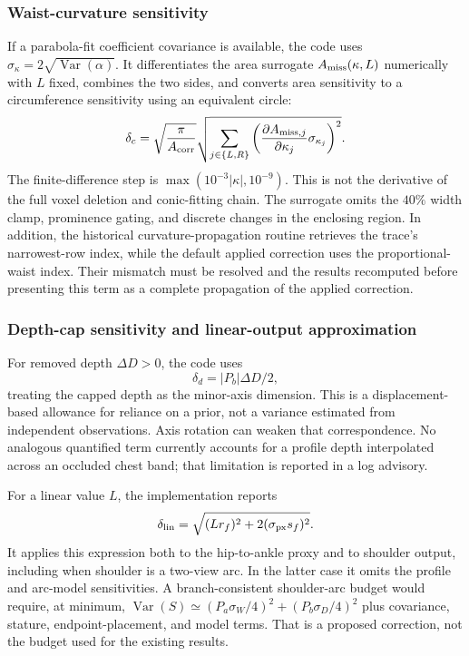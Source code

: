 \subsubsection{Waist-curvature sensitivity}
If a parabola-fit coefficient covariance is available, the code uses $\sigma_\kappa=2\sqrt{\operatorname{Var}(\alpha)}$. It differentiates the area surrogate $A_{\rm miss}(\kappa,L)$ numerically with $L$ fixed, combines the two sides, and converts area sensitivity to a circumference sensitivity using an equivalent circle:
\begin{equation}
\delta_c=\sqrt{\frac\pi{A_{\rm corr}}}
\sqrt{\sum_{j\in\{L,R\}}\left(\frac{\partial A_{{\rm miss},j}}{\partial\kappa_j}\sigma_{\kappa_j}\right)^2}.
\end{equation}
The finite-difference step is $\max(10^{-3}|\kappa|,10^{-9})$. This is not the derivative of the full voxel deletion and conic-fitting chain. The surrogate omits the $40\%$ width clamp, prominence gating, and discrete changes in the enclosing region. In addition, the historical curvature-propagation routine retrieves the trace's narrowest-row index, while the default applied correction uses the proportional-waist index. Their mismatch must be resolved and the results recomputed before presenting this term as a complete propagation of the applied correction.

\subsubsection{Depth-cap sensitivity and linear-output approximation}
For removed depth $\Delta D>0$, the code uses
\begin{equation}
\delta_d=|P_b|\Delta D/2,
\end{equation}
treating the capped depth as the minor-axis dimension. This is a displacement-based allowance for reliance on a prior, not a variance estimated from independent observations. Axis rotation can weaken that correspondence. No analogous quantified term currently accounts for a profile depth interpolated across an occluded chest band; that limitation is reported in a log advisory.

For a linear value $L$, the implementation reports
\begin{equation}
\delta_{\rm lin}=\sqrt{(Lr_f)^2+2(\sigma_{\rm px}s_f)^2}.
\end{equation}
It applies this expression both to the hip-to-ankle proxy and to shoulder output, including when shoulder is a two-view arc. In the latter case it omits the profile and arc-model sensitivities. A branch-consistent shoulder-arc budget would require, at minimum, $\operatorname{Var}(S)\simeq(P_a\sigma_W/4)^2+(P_b\sigma_D/4)^2$ plus covariance, stature, endpoint-placement, and model terms. That is a proposed correction, not the budget used for the existing results.

